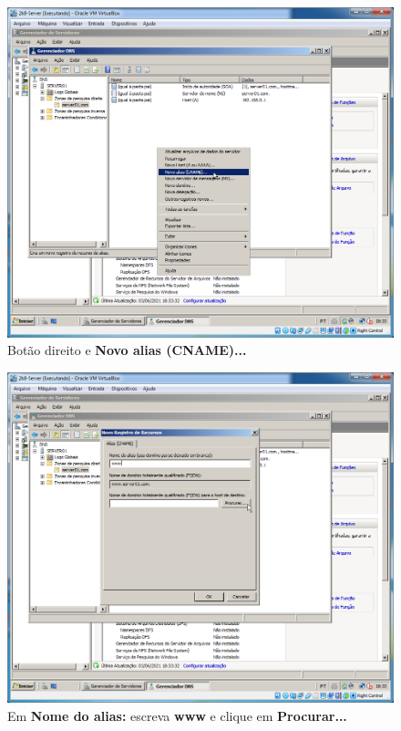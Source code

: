 \documentclass[10pt]{article}
\begin{document}
\begin{figure}[H]
    \centering
    \caption{Botão direito e \textbf{Novo alias (CNAME)...}}
    \label{fig:DNS033}
    \includegraphics[width=\linewidth]{images/windows_server/dns/033.png}
\end{figure}
\begin{figure}[H]
    \centering
    \caption{Em \textbf{Nome do alias:} escreva \textbf{www} e clique em \textbf{Procurar...}}
    \label{fig:DNS034}
    \includegraphics[width=\linewidth]{images/windows_server/dns/034.png}
\end{figure}
\end{document}
